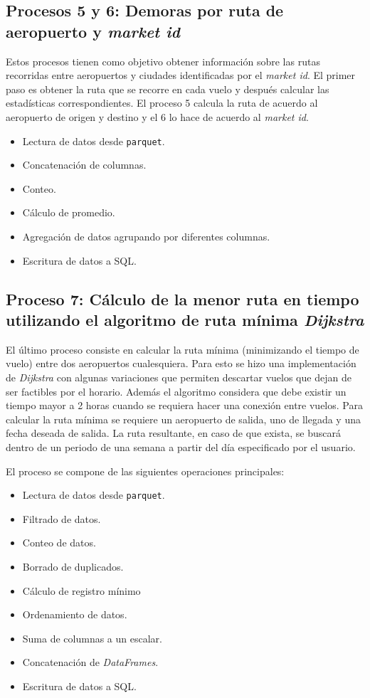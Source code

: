 \subsection{Procesos 5 y 6: Demoras por ruta de aeropuerto y \textit{market id}}

Estos procesos tienen como objetivo obtener información sobre las rutas recorridas entre aeropuertos y ciudades identificadas por el \textit{market id}. El primer paso es obtener la ruta que se recorre en cada vuelo y después calcular las estadísticas correspondientes. El proceso 5 calcula la ruta de acuerdo al aeropuerto de origen y destino y el 6 lo hace de acuerdo al \textit{market id}.

\begin{itemize}
	\item Lectura de datos desde \texttt{parquet}.
	\item Concatenación de columnas.
	\item Conteo.
	\item Cálculo de promedio.
	\item Agregación de datos agrupando por diferentes columnas.
	\item Escritura de datos a SQL.
\end{itemize}

\subsection{Proceso 7: Cálculo de la menor ruta en tiempo utilizando el algoritmo de ruta mínima \textit{Dijkstra}}

El último proceso consiste en calcular la ruta mínima (minimizando el tiempo de vuelo) entre dos aeropuertos cualesquiera. Para esto se hizo una implementación de \textit{Dijkstra} con algunas variaciones que permiten descartar vuelos que dejan de ser factibles por el horario. Además el algoritmo considera que debe existir un tiempo mayor a 2 horas cuando se requiera hacer una conexión entre vuelos. Para calcular la ruta mínima se requiere un aeropuerto de salida, uno de llegada y una fecha deseada de salida. La ruta resultante, en caso de que exista, se buscará dentro de un periodo de una semana a partir del día especificado por el usuario.   

El proceso se compone de las siguientes operaciones principales:

\begin{itemize}
	\item Lectura de datos desde \texttt{parquet}.
	\item Filtrado de datos.
	\item Conteo de datos.
	\item Borrado de duplicados.
	\item Cálculo de registro mínimo
	\item Ordenamiento de datos.
	\item Suma de columnas a un escalar.
	\item Concatenación de \textit{DataFrames}.
	\item Escritura de datos a SQL.
\end{itemize}

